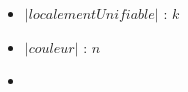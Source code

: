 
\begin{itemize}
	\item $|localementUnifiable|$ : $k$
	\item $|couleur|$ : $n$
	\item 
\end{itemize}


